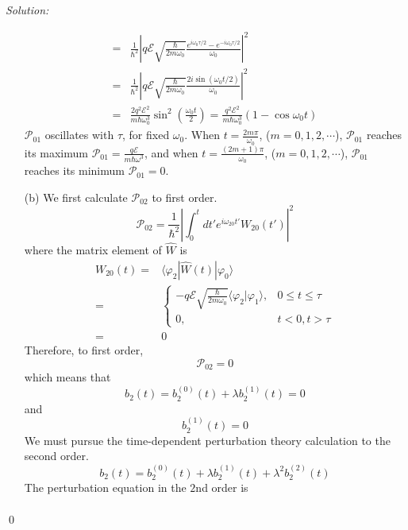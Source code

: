 \documentclass[10pt,a4paper]{article}
\newenvironment{sol}
    {\emph{Solution:}
    }
    {
    \qed
    }
\begin{document}
\begin{sol}
\begin{itemize}
\begin{align}
\nonumber=&\frac{1}{\hbar^2}\left|q\mathscr{E}\sqrt{\frac{\hbar}{2m\omega_0}}\frac{e^{i\omega_0\tau/2}-e^{-i\omega_0\tau/2}}{\omega_0}\right|^2\\
\nonumber=&\frac{1}{\hbar^2}\left|q\mathscr{E}\sqrt{\frac{\hbar}{2m\omega_0}}\frac{2i\sin(\omega_0t/2)}{\omega_0}\right|^2\\
=&\frac{2q^2\mathscr{E}^2}{m\hbar\omega_0^3}\sin^2\left(\frac{\omega_0t}{2}\right)=\frac{q^2\mathscr{E}^2}{m\hbar\omega_0^3}\left(1-\cos\omega_0t\right)
\end{align}
$\mathscr{P}_{01}$ oscillates with $\tau$, for fixed $\omega_0$. When $t=\frac{2m\pi}{\omega_0}$, ($m=0,1,2,\cdots$), $\mathscr{P}_{01}$ reaches its maximum $\mathscr{P}_{01}=\frac{q\mathscr{E}}{m\hbar\omega^3}$, and when $t=\frac{(2m+1)\pi}{\omega_0}$, ($m=0,1,2,\cdots$), $\mathscr{P}_{01}$ reaches its minimum $\mathscr{P}_{01}=0$.
\item[(b)] We first calculate $\mathscr{P}_{02}$ to first order.
\begin{equation}
\mathscr{P}_{02}=\frac{1}{\hbar^2}\left|\int_0^tdt'e^{i\omega_{20}t'}W_{20}(t')\right|^2
\end{equation}
where the matrix element of $\hat{W}$ is
\begin{align}
\nonumber W_{20}(t)=&\langle\varphi_2|\hat{W}(t)|\varphi_0\rangle\\
\nonumber=&\left\{\begin{array}{ll}
-q\mathscr{E}\sqrt{\frac{\hbar}{2m\omega_0}}\langle\varphi_2|\varphi_1\rangle,&0\leq t\leq\tau\\
0,&t<0,t>\tau
\end{array}\right.\\
=&0
\end{align}
Therefore, to first order,
\begin{equation}
\mathscr{P}_{02}=0
\end{equation}
which means that
\begin{equation}
b_2(t)=b_2^{(0)}(t)+\lambda b_2^{(1)}(t)=0
\end{equation}
and
\begin{equation}
b_2^{(1)}(t)=0
\end{equation}
We must pursue the time-dependent perturbation theory calculation to the second order.
\begin{equation}
b_2(t)=b_2^{(0)}(t)+\lambda b_2^{(1)}(t)+\lambda^2b_2^{(2)}(t)
\end{equation}
The perturbation equation in the $2$nd order is
\begin{gather}

\end{gather}
\end{itemize}
\end{sol}
\end{document}
